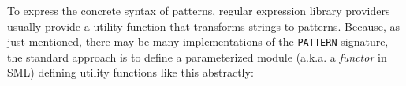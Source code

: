

To express the concrete syntax of patterns, regular expression library providers usually provide a utility function that transforms strings to patterns. Because, as just mentioned, there  may be many implementations of the \lstinline{PATTERN} signature, the standard approach is to define a parameterized module (a.k.a. a \emph{functor} in SML) defining utility functions like this abstractly:


